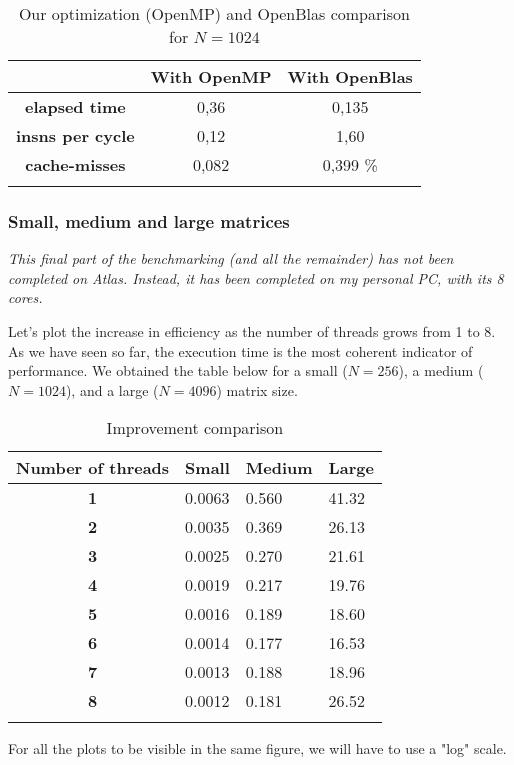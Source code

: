 \documentclass[a4paper, 10 pt, conference]{ieeeconf}
\newcommand{\tabhead}[1]{{\bfseries#1}}
\begin{document}
\begin{table}[h!]
    \centering
    \begin{tabular}{c c c}
        \toprule
        & \tabhead{With OpenMP} & \tabhead{With OpenBlas} \\
        \midrule
        \tabhead{elapsed time} & 0,36 & 0,135 \\
        \tabhead{insns per cycle} & 0,12 & 1,60 \\
        \tabhead{cache-misses} & 0,082 & 0,399 \% \\
        \bottomrule\\
    \end{tabular}
    \caption{Our optimization (OpenMP) and OpenBlas comparison for $N=1024$}
\end{table}


\subsubsection{Small, medium and large matrices}

\textit{This final part of the benchmarking (and all the remainder) has not been completed on Atlas. Instead, it has been completed on my personal PC, with its 8 cores.} 

Let's plot the increase in efficiency as the number of threads grows from 1 to 8. As we have seen so far, the execution time is the most coherent indicator of performance. We obtained the table below for a small ($N=256$), a medium ($N=1024$), and a large ($N=4096$) matrix size.
\begin{table}[h!]
    \centering
    \begin{tabular}{c l l l}
        \toprule
        \tabhead{Number of threads}& \tabhead{Small} & \tabhead{Medium} & \tabhead{Large} \\
        \midrule
        \tabhead{1} & 0.0063 & 0.560 & 41.32 \\
        \tabhead{2} & 0.0035 & 0.369 & 26.13 \\
        \tabhead{3} & 0.0025 & 0.270 & 21.61 \\
        \tabhead{4} & 0.0019 & 0.217 & 19.76 \\
        \tabhead{5} & 0.0016 & 0.189 & 18.60 \\
        \tabhead{6} & 0.0014 & 0.177 & 16.53 \\
        \tabhead{7} & 0.0013 & 0.188 & 18.96 \\
        \tabhead{8} & 0.0012 & 0.181 & 26.52 \\
        \bottomrule\\
    \end{tabular}
    \caption{Improvement comparison}
\end{table}
For all the plots to be visible in the same figure, we will have to use a "log" scale.
\end{document}
